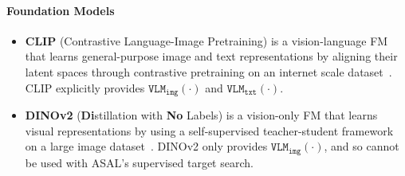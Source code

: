 \documentclass{article}
\begin{document}
\paragraph{Foundation Models}
\begin{itemize}
    \item
\textbf{CLIP} (Contrastive Language-Image Pretraining) is a vision-language FM that learns general-purpose image and text representations by aligning their latent spaces through contrastive pretraining on an internet scale dataset~\citep{radford2021learning}.
CLIP explicitly provides $\texttt{VLM}_\texttt{img}(\cdot)$ and $\texttt{VLM}_\texttt{txt}(\cdot)$.

    \item
\textbf{DINOv2} (\textbf{Di}stillation with \textbf{No} Labels) is a vision-only FM that learns visual representations by using a self-supervised teacher-student framework on a large image dataset~\citep{oquab2023dinov2}.
DINOv2 only provides $\texttt{VLM}_\texttt{img}(\cdot)$, and so cannot be used with ASAL's supervised target search.
\end{itemize}
\end{document}
